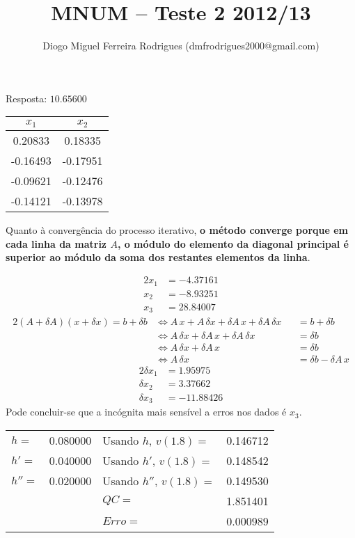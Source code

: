 \documentclass{mnum}
\title{MNUM -- Teste 2 2012/13}
\author{Diogo Miguel Ferreira Rodrigues (dmfrodrigues2000@gmail.com)}
\begin{document}
\setcounter{chapter}{11}


Resposta: $10.65600$

\begin{center} \begin{tabular}{c | c}
	$x_1$ & $x_2$ \\ \hline
	0.20833  &       0.18335 \\
	-0.16493 &       -0.17951 \\
	-0.09621 &       -0.12476 \\
	-0.14121 &       -0.13978
\end{tabular} \end{center}
Quanto à convergência do processo iterativo, \textbf{o método converge porque em cada linha da matriz $A$, o módulo do elemento da diagonal principal é superior ao módulo da soma dos restantes elementos da linha}.


\begin{alignat*}{2}
	x_1 &= -4.37161 \\
	x_2 &= -8.93251 \\
	x_3 &= 28.84007
\end{alignat*}
\begin{alignat*}{2}
	(A+\delta A)(x+\delta x)=b+\delta b
	&\iff A\,x+A\,\delta x+\delta A\, x + \delta A\, \delta x &&= b+\delta b\\
	&\iff A\,\delta x+\delta A\, x + \delta A\, \delta x &&= \delta b\\
	&\iff A\,\delta x+\delta A\, x &&= \delta b\\
	&\iff A\,\delta x &&= \delta b - \delta A\, x
\end{alignat*}
\begin{alignat*}{2}
	\delta x_1 &= 1.95975\\
	\delta x_2 &= 3.37662\\
	\delta x_3 &= -11.88426
\end{alignat*}
Pode concluir-se que a incógnita mais sensível a erros nos dados é $x_3$.
\begin{center} \begin{tabular}{l | c || l | c}
	$h  =$ & 0.080000 & Usando $h  $, $v(1.8)=$ & 0.146712 \\
	$h' =$ & 0.040000 & Usando $h' $, $v(1.8)=$ & 0.148542 \\
	$h''=$ & 0.020000 & Usando $h''$, $v(1.8)=$ & 0.149530 \\
           &          & $QC=$                   & 1.851401 \\
           &          & $Erro=$                 & 0.000989
\end{tabular} \end{center}
\end{document}
